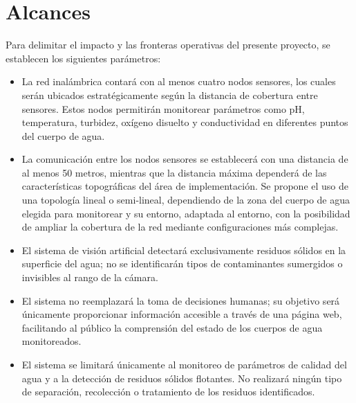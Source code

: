 \section{Alcances}
Para delimitar el impacto y las fronteras operativas del presente proyecto, se establecen los siguientes parámetros:

\begin{itemize}

  \item La red inalámbrica contará con al menos cuatro nodos sensores, los cuales serán ubicados estratégicamente según la distancia de cobertura entre sensores. Estos nodos permitirán monitorear parámetros como pH, temperatura, turbidez, oxígeno disuelto y conductividad en diferentes puntos del cuerpo de agua.

  \item La comunicación entre los nodos sensores se establecerá con una distancia de al menos 50 metros, mientras que la distancia máxima dependerá de las características topográficas del área de implementación. Se propone el uso de una topología lineal o semi-lineal, dependiendo de la zona del cuerpo de agua elegida para monitorear y su entorno, adaptada al entorno, con la posibilidad de ampliar la cobertura de la red mediante configuraciones más complejas.

  \item El sistema de visión artificial detectará exclusivamente residuos sólidos en la superficie del agua; no se identificarán tipos de contaminantes sumergidos o invisibles al rango de la cámara.

  \item El sistema no reemplazará la toma de decisiones humanas; su objetivo será únicamente proporcionar información accesible a través de una página web, facilitando al público la comprensión del estado de los cuerpos de agua monitoreados.

  \item El sistema se limitará únicamente al monitoreo de parámetros de calidad del agua y a la detección de residuos sólidos flotantes. No realizará ningún tipo de separación, recolección o tratamiento de los residuos identificados.

\end{itemize}

